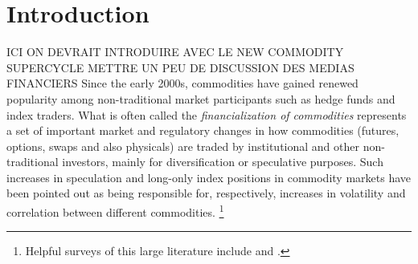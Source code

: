 \documentclass[12pt]{article}
\begin{document}
\section{Introduction} \label{sec:introduction}

ICI ON DEVRAIT INTRODUIRE AVEC LE NEW COMMODITY SUPERCYCLE METTRE UN PEU DE DISCUSSION DES MEDIAS FINANCIERS
Since the early 2000s, commodities have gained renewed popularity among non-traditional market participants such as hedge funds and index traders. What is often called the \emph{financialization of commodities} represents a set of important market and regulatory changes in how commodities (futures, options, swaps and also physicals) are traded by institutional and other non-traditional investors, mainly for diversification or speculative purposes. Such increases in speculation and long-only index positions in commodity markets have been pointed out as being responsible for, respectively, increases in volatility and correlation between different commodities. \footnote{Helpful surveys of this large literature include \citet{boyd2018update} and \citet{cheng2014financialization}.}
\end{document}
